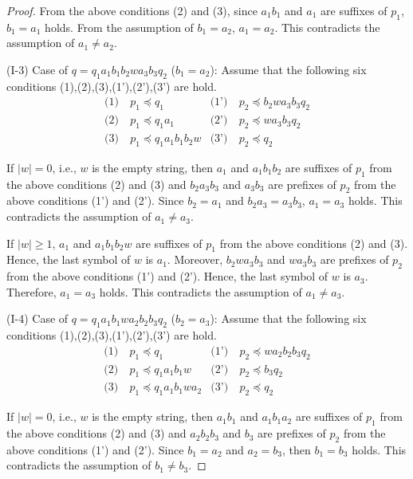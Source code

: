 \begin{proof}
\noindent
From the above conditions (2) and (3), since $a_{1}b_{1}$ and $a_{1}$ are suffixes of $p_{1}$, 
$b_{1} = a_{1}$ holds.
From the assumption of $b_{1}=a_{2}$, $a_{1}=a_{2}$.
This contradicts the assumption of $a_{1}\not= a_{2}$.
\smallskip

\noindent
(I-3) Case of $q=q_{1}a_{1}b_{1}b_{2}wa_{3}b_{3}q_{2}$ ($b_{1}=a_{2}$):
Assume that the following six conditions (1),(2),(3),(1'),(2'),(3') are hold.
\begin{align*}
\textrm{(1)}~& p_{1} \preceq q_{1} & \textrm{(1')}~& p_{2} \preceq b_{2}wa_{3}b_{3}q_{2} \\
\textrm{(2)}~& p_{1} \preceq q_{1}a_{1} & \textrm{(2')}~& p_{2} \preceq wa_{3}b_{3}q_{2} \\
\textrm{(3)}~& p_{1} \preceq q_{1}a_{1}b_{1}b_{2}w & \textrm{(3')}~& p_{2} \preceq q_{2}
\end{align*}

If $|w|=0$, i.e., $w$ is the empty string, then $a_{1}$ and $a_{1}b_{1}b_{2}$ are suffixes of $p_{1}$ from the above conditions (2) and (3)
and $b_{2}a_{3}b_{3}$ and $a_{3}b_{3}$ are prefixes of $p_{2}$ from the above conditions (1') and (2').
Since $b_{2}=a_{1}$ and $b_{2}a_{3}=a_{3}b_{3}$, $a_{1}=a_{3}$ holds.
This contradicts the assumption of $a_{1}\not= a_{3}$.

If $|w| \ge 1$, $a_{1}$ and $a_{1}b_{1}b_{2}w$ are suffixes of $p_{1}$ from the above conditions (2) and (3).
Hence, the last symbol of $w$ is $a_{1}$.
Moreover, $b_{2}wa_{3}b_{3}$ and $wa_{3}b_{3}$ are prefixes of $p_{2}$ from the above conditions (1') and (2').
Hence, the last symbol of $w$ is $a_{3}$.
Therefore, $a_{1}=a_{3}$ holds.
This contradicts the assumption of $a_{1} \ne a_{3}$.
\smallskip

\noindent
(I-4) Case of $q=q_{1}a_{1}b_{1}wa_{2}b_{2}b_{3}q_{2}$ ($b_{2}=a_{3}$):
Assume that the following six conditions (1),(2),(3),(1'),(2'),(3') are hold.
\begin{align*}
\textrm{(1)}~& p_{1} \preceq q_{1} & \textrm{(1')}~& p_{2} \preceq wa_{2}b_{2}b_{3}q_{2} \\
\textrm{(2)}~& p_{1} \preceq q_{1}a_{1}b_{1}w & \textrm{(2')}~& p_{2} \preceq b_{3}q_{2} \\
\textrm{(3)}~& p_{1} \preceq q_{1}a_{1}b_{1}wa_{2} & \textrm{(3')}~& p_{2} \preceq q_{2}
\end{align*}
\noindent

If $|w|=0$, i.e., $w$ is the empty string, then $a_{1}b_{1}$ and $a_{1}b_{1}a_{2}$ are suffixes of $p_{1}$ from the above conditions (2) and (3)
and $a_{2}b_{2}b_{3}$ and $b_{3}$ are prefixes of $p_{2}$ from the above conditions (1') and (2').
Since $b_{1}=a_{2}$ and $a_{2}=b_{3}$, then $b_{1}=b_{3}$ holds.
This contradicts the assumption of $b_{1}\not= b_{3}$.


\end{proof}
